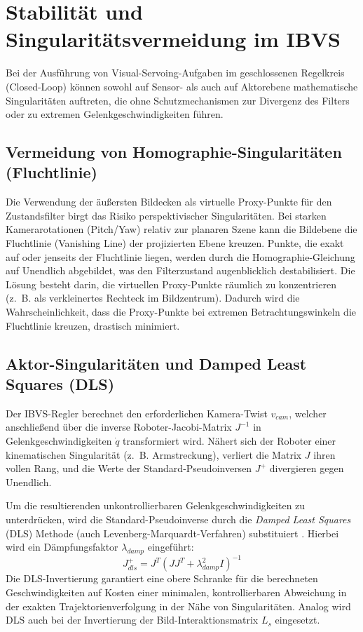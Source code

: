 \documentclass{article}
\begin{document}
\section{Stabilität und Singularitätsvermeidung im IBVS}
\label{sec:singularities}

Bei der Ausführung von Visual-Servoing-Aufgaben im geschlossenen Regelkreis (Closed-Loop) können sowohl auf Sensor- als auch auf Aktorebene mathematische Singularitäten auftreten, die ohne Schutzmechanismen zur Divergenz des Filters oder zu extremen Gelenkgeschwindigkeiten führen.




\subsection{Vermeidung von Homographie-Singularitäten (Fluchtlinie)}
Die Verwendung der äußersten Bildecken als virtuelle Proxy-Punkte für den Zustandsfilter birgt das Risiko perspektivischer Singularitäten. Bei starken Kamerarotationen (Pitch/Yaw) relativ zur planaren Szene kann die Bildebene die Fluchtlinie (Vanishing Line) der projizierten Ebene kreuzen. 
Punkte, die exakt auf oder jenseits der Fluchtlinie liegen, werden durch die Homographie-Gleichung auf Unendlich abgebildet, was den Filterzustand augenblicklich destabilisiert. 
Die Lösung besteht darin, die virtuellen Proxy-Punkte räumlich zu konzentrieren (z.~B. als verkleinertes Rechteck im Bildzentrum). Dadurch wird die Wahrscheinlichkeit, dass die Proxy-Punkte bei extremen Betrachtungswinkeln die Fluchtlinie kreuzen, drastisch minimiert.




\subsection{Aktor-Singularitäten und Damped Least Squares (DLS)}
Der IBVS-Regler berechnet den erforderlichen Kamera-Twist $v_{cam}$, welcher anschließend über die inverse Roboter-Jacobi-Matrix $J^{-1}$ in Gelenkgeschwindigkeiten $\dot{q}$ transformiert wird. Nähert sich der Roboter einer kinematischen Singularität (z.~B. Armstreckung), verliert die Matrix $J$ ihren vollen Rang, und die Werte der Standard-Pseudoinversen $J^+$ divergieren gegen Unendlich.

Um die resultierenden unkontrollierbaren Gelenkgeschwindigkeiten zu unterdrücken, wird die Standard-Pseudoinverse durch die \textit{Damped Least Squares} (DLS) Methode (auch Levenberg-Marquardt-Verfahren) substituiert \cite{wampler1986manipulator}. Hierbei wird ein Dämpfungsfaktor $\lambda_{damp}$ eingeführt:
\begin{equation}
    J_{dls}^+ = J^T \left( J J^T + \lambda_{damp}^2 I \right)^{-1}
\end{equation}
Die DLS-Invertierung garantiert eine obere Schranke für die berechneten Geschwindigkeiten auf Kosten einer minimalen, kontrollierbaren Abweichung in der exakten Trajektorienverfolgung in der Nähe von Singularitäten. Analog wird DLS auch bei der Invertierung der Bild-Interaktionsmatrix $L_s$ eingesetzt.
\end{document}
